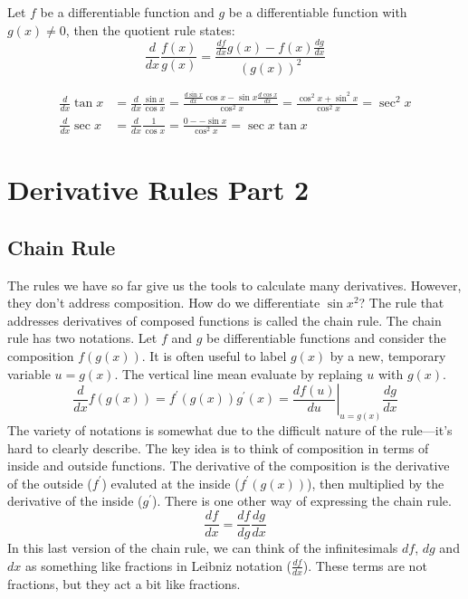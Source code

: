 \documentclass[fleqn]{report}
\begin{document}
Let $f$ be a differentiable function
and $g$ be a differentiable function with $g(x) \neq 0$, then
the quotient rule states:
\begin{equation*}
\frac{d}{dx} \frac{f(x)}{g(x)} = \frac{\frac{df}{dx} g(x) - f(x)
\frac{dg}{dx}}{(g(x))^2}
\end{equation*}

\begin{example}
\begin{align*}
\frac{d}{dx} \tan x & = \frac{d}{dx} \frac{\sin x}{\cos x} =
\frac{\frac{d \sin x}{dx} \cos x - \sin x \frac{d \cos
x}{dx}}{\cos^2 x} = \frac{\cos^2 x + \sin^2 x}{\cos^2 x} =
\sec^2 x \\
\frac{d}{dx} \sec x & = \frac{d}{dx} \frac{1}{\cos x} = \frac{0 -
- \sin x}{\cos^2 x} = \sec x \tan x 
\end{align*}
\end{example}

\chapter{Derivative Rules Part 2}
\label{Derivative Rules Part 2}

\section*{Chain Rule}

The rules we have so far give us the tools to calculate many
derivatives. However, they don't address composition. 
How do we differentiate $\sin x^2$? The rule that
addresses derivatives of composed functions is called the chain
rule. The chain rule has two notations.  Let $f$ and $g$ be
differentiable functions and consider the composition
$f(g(x))$. It is often useful to label $g(x)$ by a new,
temporary variable $u = g(x)$. The vertical line mean evaluate
by replaing $u$ with $g(x)$.
\begin{equation*}
\frac{d}{dx} f(g(x)) = f^\prime(g(x)) g^\prime(x) = \left.
\frac{df(u)}{du} \right|_{u=g(x)} \frac{dg}{dx} 
\end{equation*}
The variety of notations is somewhat due to the difficult
nature of the rule---it's hard to clearly describe. The key
idea is to think of composition in terms of inside and outside
functions. The derivative of the composition is the derivative of the
outside ($f^\prime$) evaluted at the inside ($f^\prime(g(x))$),
then multiplied by the derivative of the inside ($g^\prime$).
There is one other way of expressing the chain rule.
\begin{equation*}
\frac{df}{dx} = \frac{df}{dg} \frac{dg}{dx}
\end{equation*}
In this last version of the chain rule, we can think of the
infinitesimals $df$, $dg$ and $dx$ as something like fractions
in Leibniz notation ($\frac{df}{dx}$). These terms are not
fractions, but they act a bit like fractions.
\clearpage
\end{document}
